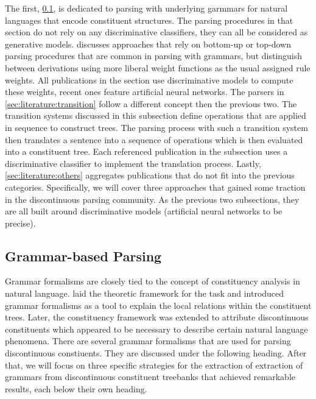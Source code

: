 \documentclass[../document.tex]{subfiles}
\begin{document}
    The first, \cref{sec:literature:grammar}, is dedicated to parsing with underlying garmmars for natural languages that encode constituent structures.
    The parsing procedures in that section do not rely on any discriminative classifiers, they can all be considered as generative models.
     discusses approaches that rely on bottom-up or top-down parsing procedures that are common in parsing with grammars, but distinguish between derivations using more liberal weight functions as the usual assigned rule weights.
    All publications in the section use discriminative models to compute these weights, recent ones feature artificial neural networks.
    The parsers in \cref{sec:literature:transition} follow a different concept then the previous two.
    The transition systems discussed in this subsection define operations that are applied in sequence to construct trees.
    The parsing process with such a transition system then translates a sentence into a sequence of operations which is then evaluated into a constituent tree.
    Each referenced publication in the subsection uses a discriminative classifier to implement the translation process.
    Lastly, \cref{sec:literature:others} aggregates publications that do not fit into the previous categories.
    Specifically, we will cover three approaches that gained some traction in the discontinuous parsing community.
    As the previous two subsections, they are all built around discriminative models (artificial neural networks to be precise). 
    
    \subsection{Grammar-based Parsing}\label{sec:literature:grammar}
    Grammar formalisms are closely tied to the concept of constituency analysis in natural language.
    \citet{Cho56} laid the theoretic framework for the task and introduced grammar formalisms as a tool to explain the local relations within the constituent trees.
    Later, the constituency framework was extended to attribute discontinuous constituents which appeared to be necessary to describe certain natural language phenomena. \citep{Shieber85}
    There are several grammar formalisms that are used for parsing discontinuous constiuents.
    They are discussed under the following heading.
    After that, we will focus on three specific strategies for the extraction of extraction of grammars from discontinuous constituent treebanks that achieved remarkable results, each below their own heading.
\end{document}
